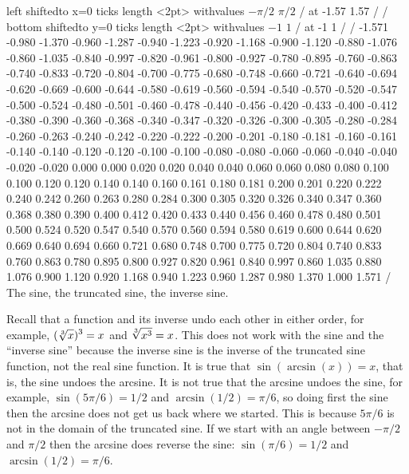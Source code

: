 {\axis left shiftedto x=0 ticks length <2pt> withvalues {$-\pi/2$} {$\pi/2$} / 
  at -1.57 1.57 / /
\axis bottom shiftedto y=0 ticks length <2pt> withvalues 
  {$-1$} {$1$} /
  at -1 1 / /
\setquadratic
{} -1.571 -0.980 -1.370 -0.960 -1.287 -0.940 -1.223 -0.920 -1.168 
-0.900 -1.120 -0.880 -1.076 -0.860 -1.035 -0.840 -0.997 -0.820 -0.961 
-0.800 -0.927 -0.780 -0.895 -0.760 -0.863 -0.740 -0.833 -0.720 -0.804 
-0.700 -0.775 -0.680 -0.748 -0.660 -0.721 -0.640 -0.694 -0.620 -0.669 
-0.600 -0.644 -0.580 -0.619 -0.560 -0.594 -0.540 -0.570 -0.520 -0.547 
-0.500 -0.524 -0.480 -0.501 -0.460 -0.478 -0.440 -0.456 -0.420 -0.433 
-0.400 -0.412 -0.380 -0.390 -0.360 -0.368 -0.340 -0.347 -0.320 -0.326 
-0.300 -0.305 -0.280 -0.284 -0.260 -0.263 -0.240 -0.242 -0.220 -0.222 
-0.200 -0.201 -0.180 -0.181 -0.160 -0.161 -0.140 -0.140 -0.120 -0.120 
-0.100 -0.100 -0.080 -0.080 -0.060 -0.060 -0.040 -0.040 -0.020 -0.020 
0.000 0.000 0.020 0.020 0.040 0.040 0.060 0.060 0.080 0.080 
0.100 0.100 0.120 0.120 0.140 0.140 0.160 0.161 0.180 0.181 
0.200 0.201 0.220 0.222 0.240 0.242 0.260 0.263 0.280 0.284 
0.300 0.305 0.320 0.326 0.340 0.347 0.360 0.368 0.380 0.390 
0.400 0.412 0.420 0.433 0.440 0.456 0.460 0.478 0.480 0.501 
0.500 0.524 0.520 0.547 0.540 0.570 0.560 0.594 0.580 0.619 
0.600 0.644 0.620 0.669 0.640 0.694 0.660 0.721 0.680 0.748 
0.700 0.775 0.720 0.804 0.740 0.833 0.760 0.863 0.780 0.895 
0.800 0.927 0.820 0.961 0.840 0.997 0.860 1.035 0.880 1.076 
0.900 1.120 0.920 1.168 0.940 1.223 0.960 1.287 0.980 1.370 
1.000 1.571 /
\endpicture}
\endtexonly
{}
\begincaption
The sine, the truncated sine, the inverse sine.
\endcaption
\endfigure

Recall that a function and its inverse undo each other in either
order, for example, $\ds (\root3\of x)^3=x$ and $\ds \root3\of{x^3}=x$. This
does not work with the sine and the ``inverse sine'' because the
inverse sine is the inverse of the truncated sine function, not the
real sine function. It is true that $\sin(\arcsin(x))=x$, that is, the
sine undoes the arcsine. It is not true that the arcsine undoes the
sine, for example, $\sin(5\pi/6)=1/2$ and $\arcsin(1/2)=\pi/6$, so
doing first the sine then the arcsine does not get us back where we
started. This is because $5\pi/6$ is not in the domain of the
truncated sine. If we start with an angle between $-\pi/2$ and $\pi/2$
then the arcsine does reverse the sine: $\sin(\pi/6)=1/2$ and
$\arcsin(1/2)=\pi/6$.

